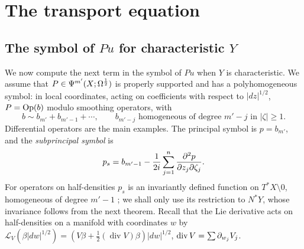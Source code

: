 \section{The transport equation}\label{hj:sec:transport}

\subsection{The symbol of $Pu$ for characteristic $Y$}
We now compute the next term in the symbol of $Pu$ when $Y$ is characteristic.
We assume that $P\in\Psi^{m'}(X;\Omega^{\frac12})$ is properly supported and has a
polyhomogeneous symbol: in local coordinates, acting on coefficients with
respect to $|dz|^{1/2}$, $P=\operatorname{Op}(b)$ modulo smoothing operators, with
\begin{equation*}
  b\sim b_{m'}+b_{m'-1}+\cdots,\qquad b_{m'-j}\text{ homogeneous of degree }
  m'-j\text{ in }|\zeta|\ge1 .
\end{equation*}
Differential operators are the main examples.  The principal symbol is
$p=b_{m'}$, and the \emph{subprincipal symbol} is
\begin{equation}\label{hj:eq:subprincipal}
  p_s=b_{m'-1}-\frac1{2i}\sum_{j=1}^n\frac{\partial^2p}{\partial z_j\partial\zeta_j}.
\end{equation}
For operators on half-densities $p_s$ is an invariantly defined function on
$T^*X\setminus0$, homogeneous of degree $m'-1$ \cite[Theorem~18.1.33]{Hormander-III};
we shall only use its restriction to $N^*Y$, whose invariance follows from the
next theorem.  Recall that the Lie derivative acts on half-densities on a
manifold with coordinates $w$ by
$\mathcal L_V(\beta|dw|^{1/2})=(V\beta+\frac12(\operatorname{div}V)\beta)|dw|^{1/2}$,
$\operatorname{div}V=\sum\partial_{w_j}V_j$.

